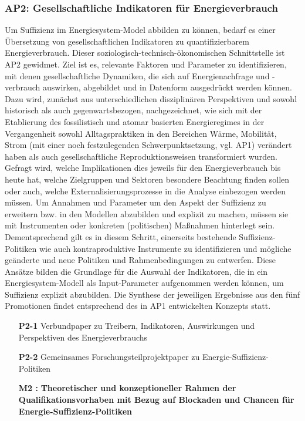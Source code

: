 \documentclass[a4paper,11pt,twoside]{scrartcl}
\begin{document}
\subsubsection*{AP2: Gesellschaftliche Indikatoren für Energieverbrauch}
Um Suffizienz im Energiesystem-Model abbilden zu können, bedarf es einer Übersetzung von gesellschaftlichen Indikatoren zu quantifizierbarem Energieverbrauch. Dieser soziologisch-technisch-ökonomischen Schnittstelle ist AP2 gewidmet. Ziel ist es, relevante Faktoren und Parameter zu identifizieren, mit denen gesellschaftliche Dynamiken, die sich auf Energienachfrage und -verbrauch auswirken, abgebildet und in Datenform ausgedrückt werden können. Dazu wird, zunächst aus unterschiedlichen disziplinären Perspektiven und sowohl historisch als auch gegenwartsbezogen, nachgezeichnet, wie sich mit der Etablierung des fossilistisch und atomar basierten Energieregimes in der Vergangenheit sowohl Alltagspraktiken in den Bereichen Wärme, Mobilität, Strom (mit einer noch festzulegenden Schwerpunktsetzung, vgl. AP1) verändert haben als auch gesellschaftliche Reproduktionsweisen transformiert wurden. Gefragt wird, welche Implikationen dies jeweils für den Energieverbrauch bis heute hat, welche Zielgruppen und Sektoren besondere Beachtung finden sollen oder auch, welche Externalisierungsprozesse in die Analyse einbezogen werden müssen. Um Annahmen und Parameter um den Aspekt der Suffizienz zu erweitern bzw. in den Modellen abzubilden und explizit zu machen, müssen sie mit Instrumenten oder konkreten (politischen) Maßnahmen hinterlegt sein. Dementsprechend gilt es in diesem Schritt, einerseits bestehende Suffizienz-Politiken wie auch kontraproduktive Instrumente zu identifizieren und mögliche geänderte und neue Politiken und Rahmenbedingungen zu entwerfen. Diese Ansätze bilden die Grundlage für die Auswahl der Indikatoren, die in ein Energiesystem-Modell als Input-Parameter aufgenommen werden können, um Suffizienz explizit abzubilden. Die Synthese der jeweiligen Ergebnisse aus den fünf Promotionen findet entsprechend des in AP1 entwickelten Konzepts statt. 

\begin{itemize}
    \item[\textbf{P2-1}] Verbundpaper zu Treibern, Indikatoren, Auswirkungen und Perspektiven des Energieverbrauchs 
    \item[\textbf{P2-2}] Gemeinsames Forschungsteilprojektpaper zu Energie-Suffizienz-Politiken 
    \item[\textbf{M2 :}] \textbf{Theoretischer und konzeptioneller Rahmen der Qualifikationsvorhaben mit Bezug auf Blockaden und Chancen für Energie-Suffizienz-Politiken}
\end{itemize}
\end{document}
